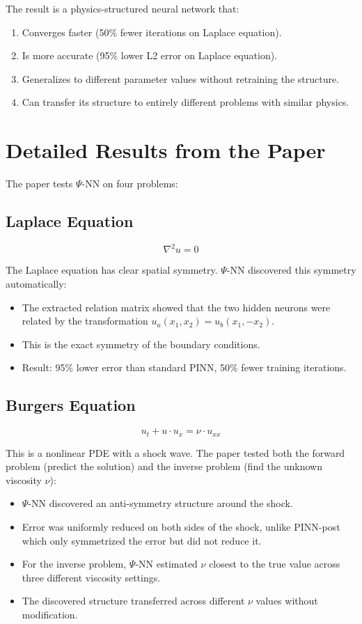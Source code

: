 \documentclass[11pt,a4paper]{article}
\begin{document}
The result is a physics-structured neural network that:
\begin{enumerate}[nosep]
    \item Converges faster (50\% fewer iterations on Laplace equation).
    \item Is more accurate (95\% lower L2 error on Laplace equation).
    \item Generalizes to different parameter values without retraining the structure.
    \item Can transfer its structure to entirely different problems with similar physics.
\end{enumerate}

\section{Detailed Results from the Paper}

The paper tests $\Psi$-NN on four problems:

\subsection{Laplace Equation}

$$\nabla^2 u = 0$$

The Laplace equation has clear spatial symmetry. $\Psi$-NN discovered this symmetry automatically:

\begin{itemize}[nosep]
    \item The extracted relation matrix showed that the two hidden neurons were related by the transformation $u_a(x_1, x_2) = u_b(x_1, -x_2)$.
    \item This is the exact symmetry of the boundary conditions.
    \item Result: 95\% lower error than standard PINN, 50\% fewer training iterations.
\end{itemize}

\subsection{Burgers Equation}

$$u_t + u \cdot u_x = \nu \cdot u_{xx}$$

This is a nonlinear PDE with a shock wave. The paper tested both the forward problem (predict the solution) and the inverse problem (find the unknown viscosity $\nu$):

\begin{itemize}[nosep]
    \item $\Psi$-NN discovered an anti-symmetry structure around the shock.
    \item Error was uniformly reduced on both sides of the shock, unlike PINN-post which only symmetrized the error but did not reduce it.
    \item For the inverse problem, $\Psi$-NN estimated $\nu$ closest to the true value across three different viscosity settings.
    \item The discovered structure transferred across different $\nu$ values without modification.
\end{itemize}
\end{document}
